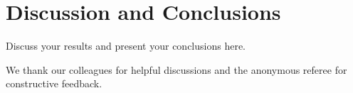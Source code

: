 \documentclass[linenumbers]{aastex701}
\begin{document}
\section{Discussion and Conclusions}

Discuss your results and present your conclusions here.


\begin{acknowledgments}
We thank our colleagues for helpful discussions and the anonymous
referee for constructive feedback.
\end{acknowledgments}



{}

\end{document}
